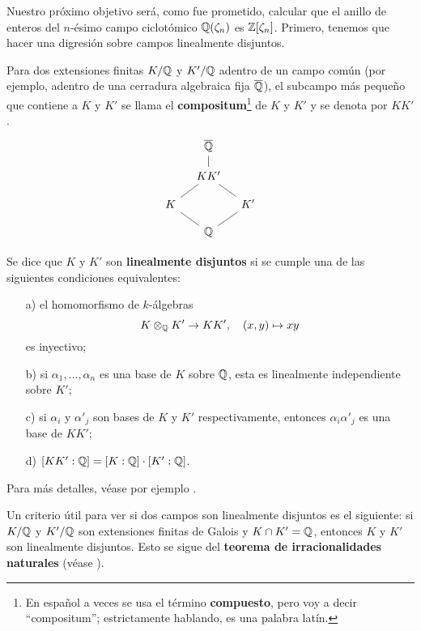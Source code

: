 Nuestro próximo objetivo será, como fue prometido, calcular que el anillo de
enteros del $n$-ésimo campo ciclotómico $\mathbb{Q} (\zeta_n)$ es
$\mathbb{Z} [\zeta_n]$. Primero, tenemos que hacer una digresión sobre campos
linealmente disjuntos.

\begin{definicion}
  Para dos extensiones finitas $K/\mathbb{Q}$ y $K'/\mathbb{Q}$ adentro de un campo común
  (por ejemplo, adentro de una cerradura algebraica fija $\overline{\mathbb{Q}}$),
  el subcampo más pequeño que contiene a $K$ y $K'$ se llama el
  \textbf{compositum}\footnote{En español a veces se usa el término
    \textbf{compuesto}, pero voy a decir ``compositum''; estrictamente hablando,
    es una palabra latín.} de $K$ y $K'$ y se denota por $K K'$.
  \[ \begin{tikzcd}[row sep=1em,column sep=1em]
    & \overline{\QQ}\ar[-]{d} \\
    & KK'\ar[-]{dl}\ar[-]{dr} \\
    K\ar[-]{dr} & & K'\ar[-]{dl} \\
    & \QQ
  \end{tikzcd} \]

  Se dice que $K$ y $K'$ son \textbf{linealmente disjuntos} si se cumple una
  de las siguientes condiciones equivalentes:
  \begin{enumerate}
  \item[a)] el homomorfismo de $k$-álgebras
    $$K\otimes_{\mathbb{Q}} K'\to K K', \quad (x,y) \mapsto xy$$
    es inyectivo;

  \item[b)] si $\alpha_1, \ldots, \alpha_n$ es una base de $K$ sobre $\mathbb{Q}$, esta
    es linealmente independiente sobre $K'$;

  \item[c)] si $\alpha_i$ y $\alpha'_j$ son bases de $K$ y $K'$ respectivamente,
    entonces $\alpha_i \alpha'_j$ es una base de $K K'$;

  \item[d)] $[KK' : \mathbb{Q}] = [K : \mathbb{Q}]\cdot [K' : \mathbb{Q}]$.
  \end{enumerate}
\end{definicion}

Para más detalles, véase por ejemplo \cite[Chapter~V, \S~20]{Morandi-GTM167}.

\begin{comentario}
  Un criterio útil para ver si dos campos son linealmente disjuntos es
  el siguiente: si $K/\mathbb{Q}$ y $K'/\mathbb{Q}$ son extensiones finitas de Galois y
  $K \cap K' = \mathbb{Q}$, entonces $K$ y $K'$ son linealmente disjuntos.
  Esto se sigue del \textbf{teorema de irracionalidades naturales}
  (véase \cite[Chapter~I, Theorem~5.5]{Morandi-GTM167}).
\end{comentario}

